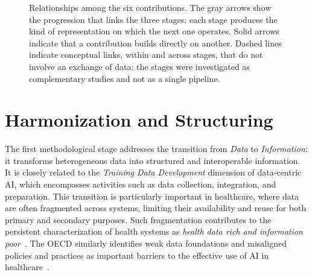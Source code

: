 \begin{figure}[!htb]
\caption{Relationships among the six contributions. The gray arrows show the progression that links the three stages: each stage produces the kind of representation on which the next one operates. Solid arrows indicate that a contribution builds directly on another. Dashed lines indicate conceptual links, within and across stages, that do not involve an exchange of data: the stages were investigated as complementary studies and not as a single pipeline.}
\label{fig:paper_relationships}
\end{figure}


\section{Harmonization and Structuring}
\label{sec:harmonization_structuring}
The first methodological stage addresses the transition from \emph{Data} to \emph{Information}: it transforms heterogeneous data into structured and interoperable information. It is closely related to the \emph{Training Data Development} dimension of data-centric AI, which encompasses activities such as data collection, integration, and preparation. This transition is particularly important in healthcare, where data are often fragmented across systems, limiting their availability and reuse for both primary and secondary purposes. Such fragmentation contributes to the persistent characterization of health systems as \emph{health data rich and information poor}~\cite{oecd_interoperability_2026}. The OECD similarly identifies weak data foundations and misaligned policies and practices as important barriers to the effective use of AI in healthcare~\cite{oecd_collective_2024,oecd_interoperability_2026}.

